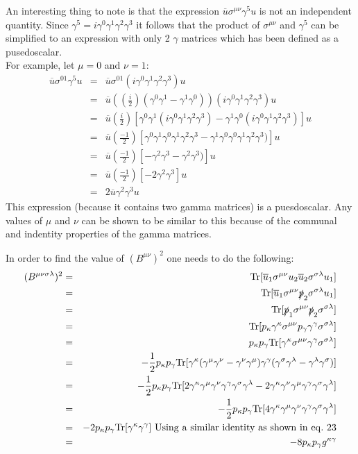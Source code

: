 \documentclass[12pt]{article}
\def \bea{\begin{eqnarray}}
\def \eea{\end{eqnarray}}
\def \Tr{{\rm Tr}}
\def \nn{\nonumber}
\def \nl{\nn \\}
\def \ou{\overline{u}}
\def \ga{\gamma}
\def \ka{\kappa}
\def \la{\lambda}
\def \si{\sigma}
\begin{document}
\begin{enumerate}
An interesting thing to note is that the expression $\ou \si^{\mu\nu} \ga^5 u$ is not an independent quantity. Since $\ga^5 =i\ga^0\ga^1\ga^2\ga^3$ it follows that the product of $\si^{\mu\nu}$ and $\ga^5$ can be simplified to an expression with only 2 $\ga$ matrices which has been defined as a pusedoscalar.\nl
For example, let $\mu =0$ and $\nu=1$:
\bea
\ou \si^{01} \ga^5 u &=& \ou \si^{01} (i\ga^0\ga^1\ga^2\ga^3) u \\\nonumber
&=&  \ou ((\frac{i}{2})(\ga^0\ga^1 -\ga^1\ga^0)) (i\ga^0\ga^1\ga^2\ga^3) u \nl\nonumber
&=&  \ou (\frac{i}{2})[\ga^0\ga^1(i\ga^0\ga^1\ga^2\ga^3) -\ga^1\ga^0(i\ga^0\ga^1\ga^2\ga^3)] u \nl\nonumber
&=&  \ou (\frac{-1}{2})[\ga^0\ga^1\ga^0\ga^1\ga^2\ga^3 -\ga^1\ga^0\ga^0\ga^1\ga^2\ga^3)] u \nl\nonumber
&=& \ou (\frac{-1}{2})[-\ga^2\ga^3 -\ga^2\ga^3)] u\nl\nonumber
&=& \ou (\frac{-1}{2})[-2\ga^2\ga^3] u\nl
&=& 2\ou \ga^2\ga^3 u
\eea
This expression (because it contains two gamma matrices) is a puesdoscalar. Any values of $\mu$ and $\nu$ can be shown to be similar to this because of the communal and indentity properties of the gamma matrices.

In order to find the value of $(B^{\mu\nu})^2$ one needs to do the following:
\bea
(B^{\mu\nu\si\la})^2 &=& \Tr[\ou_1 \si^{\mu\nu} u_2\ou_2 \si^{\si\la}u_1]\nl
&=& \Tr[\ou_1 \si^{\mu\nu}\slashed{p}_2 \si^{\si\la} u_1]\nl
&=& \Tr[\slashed{p}_1\si^{\mu\nu}\slashed{p}_2 \si^{\si\la}]\nl
&=& \Tr[p_\ka \ga^\ka \si^{\mu\nu}p_\ga \ga^\ga \si^{\si\la}]\nl
&=& p_\ka p_\ga \Tr[\ga^\ka \si^{\mu\nu}\ga^\ga \si^{\si\la}]\nl
&=& -\frac{1}{2} p_\ka p_\ga \Tr[\ga^\ka (\ga^\mu \ga^\nu - \ga^\nu \ga^\mu) \ga^\ga (\ga^\si \ga^\la - \ga^\la \ga^\si)]\nl
&=& -\frac{1}{2} p_\ka p_\ga \Tr[2\ga^\ka \ga^\mu \ga^\nu \ga^\ga \ga^\si \ga^\la  - 2\ga^\ka \ga^\nu \ga^\mu \ga^\ga \ga^\si \ga^\la]\nl
&=& -\frac{1}{2} p_\ka p_\ga \Tr[4\ga^\ka \ga^\mu \ga^\nu \ga^\ga \ga^\si \ga^\la]\nl
&=& -2p_\ka p_\ga \Tr[\ga^\ka \ga^\ga]~{\rm Using~ a~ similar~ identity~ as~ shown~ in~ eq.~ 23}\nl
&=& -8p_\ka p_\ga g^{\ka\ga}
\eea

\end{enumerate}
\end{document}
